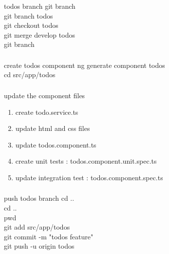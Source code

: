 \documentclass{beamer}
\begin{document}
\begin{frame}\frametitle{} 

\begin{block}{todos branch}
git branch \\
git branch todos \\
git checkout todos \\
git merge develop todos \\
git branch 
\end{block}

\end{frame}


\begin{frame}\frametitle{} 

\begin{block}{create todos component}
ng generate component todos \\
cd src/app/todos \\
\end{block}

\end{frame}




\begin{frame}\frametitle{} 

update the component files

\begin{enumerate}
\item create todo.service.ts
\item update html and css files
\item update todos.component.ts 
\item create unit tests :        todos.component.unit.spec.ts
\item update integration test :  todos.component.spec.ts
\end{enumerate}


\end{frame}


\begin{frame}\frametitle{} 


\begin{block}{push todos branch}
cd .. \\
cd .. \\
pwd  \\
git add src/app/todos \\
git commit -m "todos feature" \\
git push -u origin todos \\
\end{block}
\end{frame}
\end{document}
